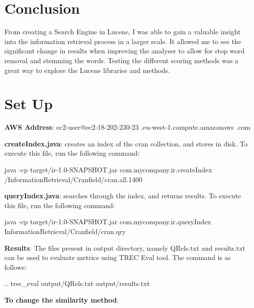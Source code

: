 \section{Conclusion}
From creating a Search Engine in Lucene, I was able to gain a valuable insight into the information retrieval process in a larger scale. It allowed me to see the significant change in results when improving the analyser to allow for stop word removal and stemming  the words. Testing the different scoring methods was a great way to explore the Lucene libraries and methods.\par 

\section{Set Up}

\textbf{AWS Address}: \newline ec2-user@ec2-18-202-230-23
.eu-west-1.compute.amazonaws \newline .com \newline


\noindent \textbf{createIndex.java}: creates an index of the cran collection, and stores in disk. To execute this file, run the following command:

\begin{center} 
java -cp target/ir-1.0-SNAPSHOT.jar com.mycompany.ir.createIndex /InformationRetrieval/Cranfield/cran.all.1400  \newline
\end{center}

\noindent \textbf{queryIndex.java}: searches through the index, and returns results. To execute this file, run the following command:

\begin{center} 
 java -cp target/ir-1.0-SNAPSHOT.jar com.mycompany.ir.queryIndex InformationRetrieval/Cranfield/cran.qry \newline
\end{center}

\noindent \textbf{Results}: The files present in output directory, namely QRels.txt and results.txt can be used to evaluate metrics using TREC Eval tool. The command is as follows:

\begin{center} 
.. trec\_eval output/QRels.txt output/results.txt \newline
\end{center}

\noindent \textbf{To change the similarity method}: 

